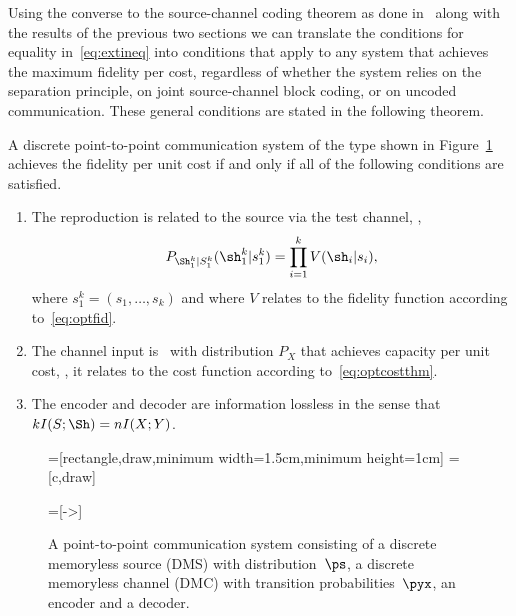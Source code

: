 Using the converse to the source-channel coding theorem as done
in~\cite{GastparThesis} along with the results of the previous two
sections we
can translate the conditions for equality in~\eqref{eq:extineq} into conditions
that apply to any system that achieves the maximum fidelity per cost, regardless
of whether the system relies on the separation principle, on joint
source-channel block coding, or on uncoded communication.  These general
conditions are stated in the following theorem.


\begin{theorem}
  \label{thm:bla}
  A discrete point-to-point communication system of the type shown in
  Figure~\ref{fig:scmodel} achieves the fidelity per unit cost if and only if
  all of the following conditions are satisfied.

\begin{enumerate}
  \item The reproduction is related to the source via the test channel, \ie,
    \[P_{\Sh_{1}^{k}|S_{1}^{k}}(\sh_{1}^{k}|s_{1}^{k})=\prod_{i=1}^k
    V(\sh_i|s_i), \]
    where $s_1^k =(s_1, \ldots, s_k)$     and where $V$ relates to the fidelity
    function according to~\eqref{eq:optfid}.
  \item The channel input is \iid\ with distribution $P_X$ that achieves
    capacity per unit cost, \ie, it relates to the cost function according
    to~\eqref{eq:optcostthm}.
  \item The encoder and decoder are information lossless in the sense that
    $kI(S;\Sh) = n I(X;Y)$.  
\end{enumerate}
\end{theorem}

\begin{figure}[tbph]
  \begin{center}
  =[rectangle,draw,minimum width=1.5cm,minimum height=1cm]
  =[c,draw]

  =[->]
  \end{center}
  \caption{A point-to-point communication system consisting of a discrete
  memoryless source (DMS) with distribution~$\ps$, a discrete memoryless channel
  (DMC) with transition probabilities~$\pyx$, an encoder and a decoder.}
  \label{fig:scmodel}
\end{figure}



